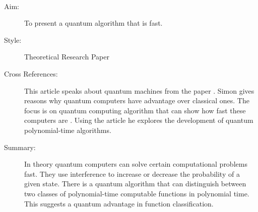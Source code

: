 \documentclass{Assignment}
\begin{document}
\newpage


\cite{doi:10.1137/S0097539796298637}~
\begin{description}
	\item[Aim:]
	To present a quantum algorithm that is fast.
	\item [Style:]
	Theoretical Research Paper
	\item [Cross References:]
	This article speaks about quantum machines from the paper \cite{Deutsch1989}.
	Simon gives reasons why quantum computers have advantage over classical ones.
	The focus is on quantum computing algorithm that can show how fast these computers are	.
	Using the article \cite{shor1994algorithms} he explores the development of quantum polynomial-time algorithms.
	\item[Summary:]
	 In theory quantum computers can solve certain computational problems fast.
	They use interference to increase or decrease the probability of a given state.
	There is a quantum algorithm that can distinguish between two classes of polynomial-time computable functions in polynomial time. 
	This suggests a quantum advantage in function classification. 
\end{description}

\newpage
\cite{UQS}~
\end{document}
